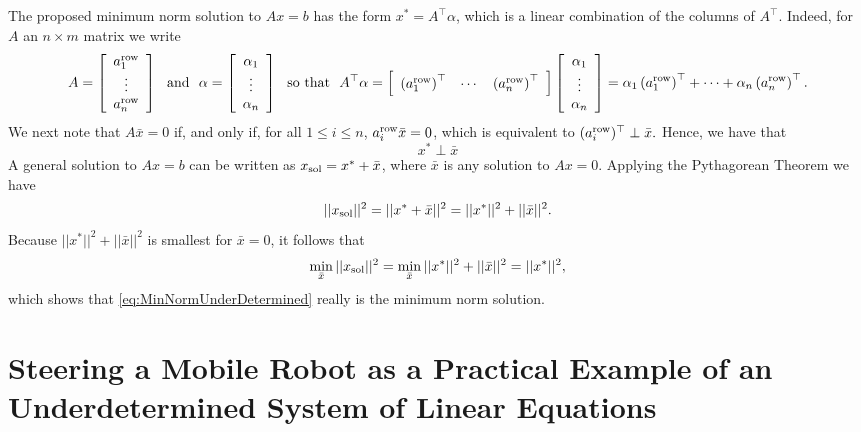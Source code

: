 The proposed minimum norm solution to $Ax=b$ has the form $x^\ast = A^\top \alpha$, which is a linear combination of the columns of $A^\top$. Indeed, for $A$ an $n \times m$ matrix we write
$$A = \left[ \begin{array}{c}
a^{\rm row}_1 \\
\vdots\\
a^{\rm row}_n
  \end{array} \right]~~\text{and}~~\alpha=\left[ \begin{array}{c}
\alpha_1 \\
\vdots \\
\alpha_n
  \end{array} \right]~~\text{so that}~~A^\top \alpha = 
    \left[ \begin{array}{ccc}
\left(a^{\rm row}_1\right)^\top &
\cdots & 
\left(a^{\rm row}_n\right)^\top
  \end{array} \right]
  \left[ \begin{array}{c}
\alpha_1 \\
\vdots \\
\alpha_n
  \end{array} \right]=
  \alpha_1 \left(a^{\rm row}_1\right)^\top + \cdots +  \alpha_n \left(a^{\rm row}_n \right)^\top.$$
  We next note that $A \bar{x} = 0$ if, and only if, for all $1 \le i \le n$,
  $a^{\rm row}_i \bar{x} = 0$, which is equivalent to $ ( a^{\rm row}_i )^\top \perp \bar{x}.$ Hence, we have that
  $$x^\ast \perp \bar{x} $$
  A general solution to $Ax=b$ can be written as $x_{\rm sol}= x^\ast + \bar{x}$, where $\bar{x}$ is any solution to $Ax=0$. Applying the Pythagorean Theorem we have $$||x_{\rm sol}||^2 = || x^\ast + \bar{x}||^2 = || x^\ast||^2 + || \bar{x}||^2.$$
Because $|| x^\ast||^2 + || \bar{x}||^2$ is smallest for $\bar{x}=0$, it follows that
  $$ \min_{ \bar{x} } ||x_{\rm sol}||^2 =  \min_{ \bar{x} }  || x^\ast||^2 + || \bar{x}||^2 =  || x^\ast||^2, $$
  which shows that \eqref{eq:MinNormUnderDetermined} really is the minimum norm solution.

  
  
\section{Steering a Mobile Robot as a Practical Example of an Underdetermined System of Linear Equations} 
\label{sec:PracticalUnderDeterminedExample}

